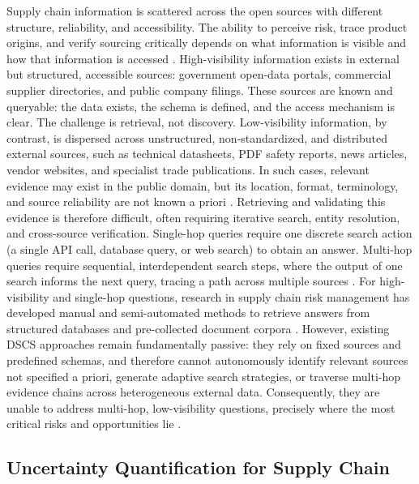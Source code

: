\documentclass{article}
\begin{document}
Supply chain information is scattered across the open sources with different structure, reliability, and accessibility. The ability to perceive risk, trace product origins, and verify sourcing critically depends on what information is visible and how that information is accessed \citep{ivanov2016supply,tiwari2024supply}. 
High-visibility information exists in external but structured, accessible sources: government open-data portals, commercial supplier directories, and public company filings. These sources are known and queryable: the data exists, the schema is defined, and the access mechanism is clear. The challenge is retrieval, not discovery.
Low-visibility information, by contrast, is dispersed across unstructured, non-standardized, and distributed external sources, such as technical datasheets, PDF safety reports, news articles, vendor websites, and specialist trade publications. In such cases, relevant evidence may exist in the public domain, but its location, format, terminology, and source reliability are not known a priori \citep{kosasih2024towards}. Retrieving and validating this evidence is therefore difficult, often requiring iterative search, entity resolution, and cross-source verification. Single-hop queries require one discrete search action (a single API call, database query, or web search) to obtain an answer. Multi-hop queries require sequential, interdependent search steps, where the output of one search informs the next query, tracing a path across multiple sources \citep{chen2019understanding}.
For high-visibility and single-hop questions, research in supply chain risk management has developed manual and semi-automated methods to retrieve answers from structured databases and pre-collected document corpora \citep{brintrup2024digital}. However, existing DSCS approaches remain fundamentally passive: they rely on fixed sources and predefined schemas, and therefore cannot autonomously identify relevant sources not specified a priori, generate adaptive search strategies, or traverse multi-hop evidence chains across heterogeneous external data.
Consequently, they are unable to address multi-hop, low-visibility questions, precisely where the most critical risks and opportunities lie \citep{brintrup2024digital, kosasih2022machine}.


\subsection{Uncertainty Quantification for Supply Chain}
\label{related:3}
\end{document}
